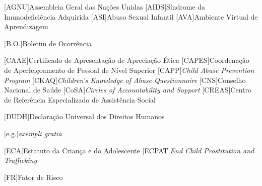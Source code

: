 
\listoffigures*
\cleardoublepage



\listoftables*
\cleardoublepage

\begin{siglas}
	\begin{acronym}[labelsep=1.5cm]
		\setlength{\itemindent}{1em}

		{{Assembleia Geral das Nações Unidas}}
		{{Síndrome da Imunodeficiência Adquirida}}
		[ASI]{{Abuso Sexual Infantil}} 
		[AVA]{{Ambiente Virtual de Aprendizagem}}

		{{Boletim de Ocorrência}}

		{{Certificado de Apresentação de Apreciação Ética}}
		[CAPES]{{Coordenação de Aperfeiçoamento de Pessoal de Nível Superior}}
		{\textit{Child Abuse Prevention Program}}
		{\textit{Children’s Knowledge of Abuse Questionnaire}}
		[CNS]{{Conselho Nacional de Saúde}}
		{\textit{Circles of Accountability and Support}}
		[CREAS]{{Centro de Referência Especializado de Assistência Social}}
		
		{{Declaração Universal dos Direitos Humanos}}

		{\textit{exempli gratia}}

		[ECA]{{Estatuto da Criança e do Adolescente}}
		[ECPAT]{\textit{End Child Prostitution and Trafficking}}

		[FR]{{Fator de Risco}}


\end{acronym}
\end{siglas}
